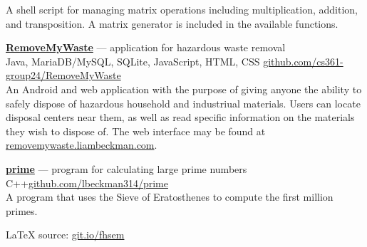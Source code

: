 \documentclass[a4paper]{article}
\begin{document}
A shell script for managing matrix operations including multiplication, addition, and transposition. A matrix generator is included in the available functions.

\textcolor{my-grey}{\dotfill}
\medbreak

\textcolor{my-blue}{\textbf{\href{https://liambeckman.com/code/matriz}{RemoveMyWaste}}} --- application for hazardous waste removal\\
\textcolor{my-grey}{Java, MariaDB/MySQL, SQLite, JavaScript, HTML, CSS \hfill \href{https://github.com/cs361-group24/RemoveMyWaste}{github.com/cs361-group24/RemoveMyWaste}}\\

An Android and web application with the purpose of giving anyone the ability to safely dispose of hazardous household and industriual materials. Users can locate disposal centers near them, as well as read specific information on the materials they wish to dispose of. The web interface may be found at \textcolor{my-blue}{\href{https://removemywaste.liambeckman.com}{removemywaste.liambeckman.com}}.

\textcolor{my-grey}{\dotfill}
\medbreak

\textcolor{my-blue}{\textbf{\href{https://liambeckman.com/code/matriz}{prime}}} --- program for calculating large prime numbers\\
\textcolor{my-grey}{C++\hfill \href{https://github.com/lbeckman314/prime}{github.com/lbeckman314/prime}}\\

A program that uses the Sieve of Eratosthenes to compute the first million primes.

\textcolor{my-grey}{\dotfill}
\medbreak

\vfill
\hfill\textcolor{my-red}{\LaTeX{} source: \href{https://git.io/fhsem}{git.io/fhsem}}
\end{document}
